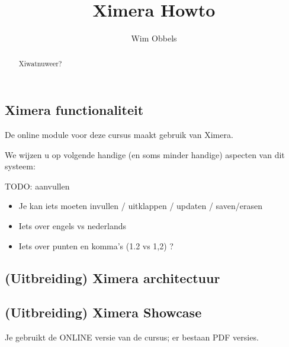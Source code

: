\documentclass[handout]{ximera}
\author{Wim Obbels}
\title{Ximera Howto}
\begin{document}
\begin{abstract}
	Xiwatnuweer?
\end{abstract}
\maketitle

\subsection{Ximera functionaliteit}
De online module voor deze cursus maakt gebruik van Ximera.

We wijzen u op volgende handige (en soms minder handige) aspecten van dit systeem:


TODO: aanvullen


\begin{itemize}
	\item Je kan iets moeten invullen / uitklappen / updaten / saven/erasen

	\item Iets over engels vs nederlands

	\item Iets over punten en komma's  (1.2 vs 1,2) ?

\end{itemize}

\subsection{(Uitbreiding) Ximera architectuur}

\subsection{(Uitbreiding) Ximera Showcase}


\begin{onlineOnly}
    Je gebruikt de ONLINE versie van de cursus; er bestaan PDF versies.
\end{onlineOnly}
\end{document}

